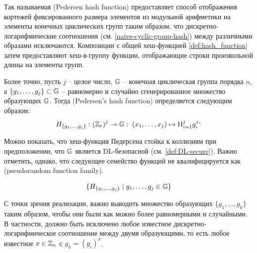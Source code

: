 \subsubsection{}
\label{def:Pedersen_hash}
Так называемая  (Pedersen hash function) \citep{Pedersen92} предоставляет способ отображения кортежей фиксированного размера элементов из модульной арифметики на элементы конечных циклических групп таким образом, что дискретно-логарифмические соотношения (см. \examplename{} \ref{naive-cyclic-group-hash}) между различными образами исключаются. Композиции  с общей хеш-функцией \eqref{def:hash_function} затем предоставляют хеш-в-группу функции, отображающие строки произвольной длины на элементы групп.

Более точно, пусть $j$ -- целое число, $\mathbb{G}$ -- конечная циклическая группа порядка $n$, а $\{g_1, \ldots, g_j\} \subset \mathbb{G}$ -- равномерно и случайно сгенерированное множество образующих $\mathbb{G}$. Тогда  (Pedersen's hash function) определяется следующим образом:
\begin{equation}\label{eq:Pedersen_hash}
H_{\{g_1,\ldots,g_j\}} : \left(\mathbb{Z}_r\right)^j \to \mathbb{G}:\; (x_1,\ldots,x_j)\mapsto \Pi_{i=1}^j g_i^{x_i}
\end{equation}

Можно показать, что хеш-функция Педерсена стойка к коллизиям при предположении, что $\mathbb{G}$ является DL-безопасной (см. \secname \ref{def:DL-secure}). Важно отметить, однако, что следующее семейство функций не квалифицируется как  (pseudorandom function family).

\begin{equation}
\label{Pedersen_not_pseudorandom}
\{H_{\{g_1,\ldots,g_j\}}\;|\;g_1,\ldots,g_j\in \mathbb{G}\}
\end{equation}

С точки зрения реализации, важно выводить множество образующих $\{g_1,\ldots,g_k\}$ таким образом, чтобы они были как можно более равномерными и случайными. В частности, должно быть исключено любое известное дискретно-логарифмическое соотношение между двумя образующими, то есть любое известное $x\in \mathbb{Z}_n$ с $g_h = (g_i)^x$.

